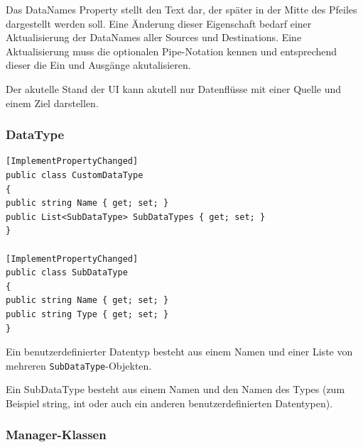 Das DataNames Property stellt den Text dar, der später in der Mitte des
Pfeiles dargestellt werden soll. Eine Änderung dieser Eigenschaft bedarf
einer Aktualisierung der DataNames aller Sources und Destinations.
Eine Aktualisierung muss die optionalen Pipe-Notation kennen und
entsprechend dieser die Ein und Ausgänge akutalisieren.

Der akutelle Stand der UI kann akutell nur Datenflüsse mit einer Quelle und
einem Ziel darstellen.

\subsubsection{DataType}


\begin{verbatim}
[ImplementPropertyChanged]
public class CustomDataType
{
public string Name { get; set; }
public List<SubDataType> SubDataTypes { get; set; }
}

[ImplementPropertyChanged]
public class SubDataType
{
public string Name { get; set; }
public string Type { get; set; }
}
\end{verbatim}

Ein benutzerdefinierter Datentyp besteht aus einem Namen und einer Liste von mehreren
\texttt{SubDataType}-Objekten. 

Ein SubDataType besteht aus einem Namen und den Namen
des Types (zum Beispiel string, int oder auch ein anderen benutzerdefinierten
Datentypen).

\subsubsection{Manager-Klassen}

